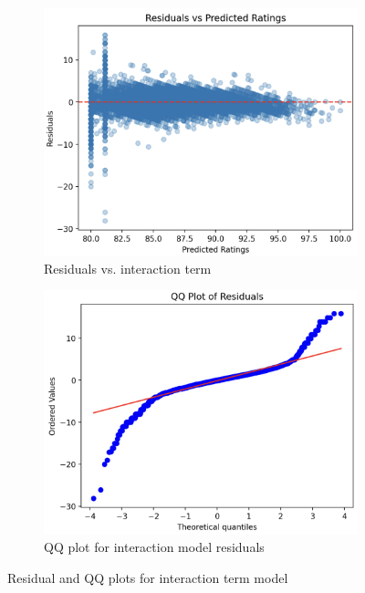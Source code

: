 \documentclass{article}
\begin{document}
\begin{figure}[!ht]
    \centering
    \begin{subfigure}[b]{0.45\linewidth}
        \centering
        \includegraphics[width=\linewidth]{residuals_interaction.png}
        \caption{Residuals vs. interaction term}
        \label{fig:residuals_interaction}
    \end{subfigure}
    \hfill
    \begin{subfigure}[b]{0.45\linewidth}
        \centering
        \includegraphics[width=\linewidth]{QQ_interaction.png}
        \caption{QQ plot for interaction model residuals}
        \label{fig:qq_interaction}
    \end{subfigure}
    \caption{Residual and QQ plots for interaction term model}
    \label{fig:interaction_side_by_side}
\end{figure}
\end{document}
